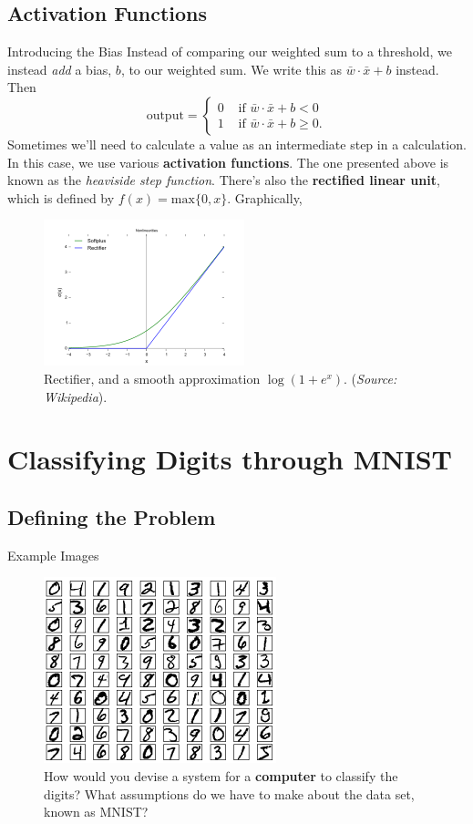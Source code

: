 \documentclass[xcolor=dvipsnames, fontsize=11pt, %
pagesize, %
parskip=half-, t]{beamer}
\begin{document}
\subsection{Activation Functions}
\begin{frame}{Introducing the Bias}
Instead of comparing our weighted sum to a threshold, we instead \textit{add} a bias, $b$, to our weighted sum. \pause We write this as $\bar{w}\cdot \bar{x}+b$ instead. \pause Then $$\text{output}=\begin{cases} 0 & \text{ if } \bar{w}\cdot \bar{x}+b<0 \\ 
1 & \text{ if } \bar{w}\cdot \bar{x}+b\ge 0. \end{cases}$$ \pause
Sometimes we'll need to calculate a value as an intermediate step in a calculation. In this case, we use various \textbf{activation functions}. \pause The one presented above is known as the \textit{heaviside step function}. There's also the \textbf{rectified linear unit}, which is defined by $f(x)=\text{max}\{0, x\}$. \pause Graphically,
\begin{figure}
\includegraphics[scale=0.42]{rectifier.png}
\caption{Rectifier, and a smooth approximation $\log(1+e^x)$. (\textit{Source: Wikipedia}).}
\end{figure}

\end{frame}





\section{Classifying Digits through MNIST}
\subsection{Defining the Problem}
\begin{frame}[c]{Example Images}
\begin{figure} 
\center
\includegraphics{mnist_100_digits.png}
\caption{How would you devise a system for a \textbf{computer} to classify the digits? What assumptions do we have to make about the data set, known as MNIST? }
\end{figure}
\end{frame}
\end{document}

